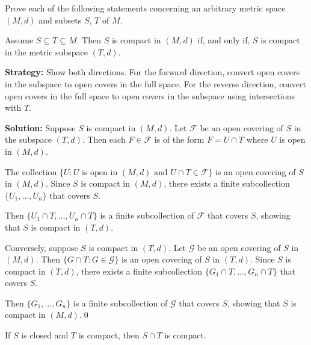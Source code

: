 Prove each of the following statements concerning an arbitrary metric space $(M,d)$ and subsets $S$, $T$ of $M$.



\begin{problembox}
\begin{problemstatement}
Assume \( S \subseteq T \subseteq M \). Then \( S \) is compact in \((M, d)\) if, and only if, \( S \) is compact in the metric subspace \((T, d)\).
\end{problemstatement}
\end{problembox}

\noindent\textbf{Strategy:} Show both directions. For the forward direction, convert open covers in the subspace to open covers in the full space. For the reverse direction, convert open covers in the full space to open covers in the subspace using intersections with $T$.

\bigskip\noindent\textbf{Solution:} Suppose $S$ is compact in $(M,d)$. Let $\mathcal{F}$ be an open covering of $S$ in the subspace $(T,d)$. Then each $F \in \mathcal{F}$ is of the form $F = U \cap T$ where $U$ is open in $(M,d)$.

The collection $\{U : U \text{ is open in } (M,d) \text{ and } U \cap T \in \mathcal{F}\}$ is an open covering of $S$ in $(M,d)$. Since $S$ is compact in $(M,d)$, there exists a finite subcollection $\{U_1, \ldots, U_n\}$ that covers $S$.

Then $\{U_1 \cap T, \ldots, U_n \cap T\}$ is a finite subcollection of $\mathcal{F}$ that covers $S$, showing that $S$ is compact in $(T,d)$.

Conversely, suppose $S$ is compact in $(T,d)$. Let $\mathcal{G}$ be an open covering of $S$ in $(M,d)$. Then $\{G \cap T : G \in \mathcal{G}\}$ is an open covering of $S$ in $(T,d)$. Since $S$ is compact in $(T,d)$, there exists a finite subcollection $\{G_1 \cap T, \ldots, G_n \cap T\}$ that covers $S$.

Then $\{G_1, \ldots, G_n\}$ is a finite subcollection of $\mathcal{G}$ that covers $S$, showing that $S$ is compact in $(M,d)$.\qed


\begin{problembox}
\begin{problemstatement}
If \( S \) is closed and \( T \) is compact, then \( S \cap T \) is compact.
\end{problemstatement}
\end{problembox}

